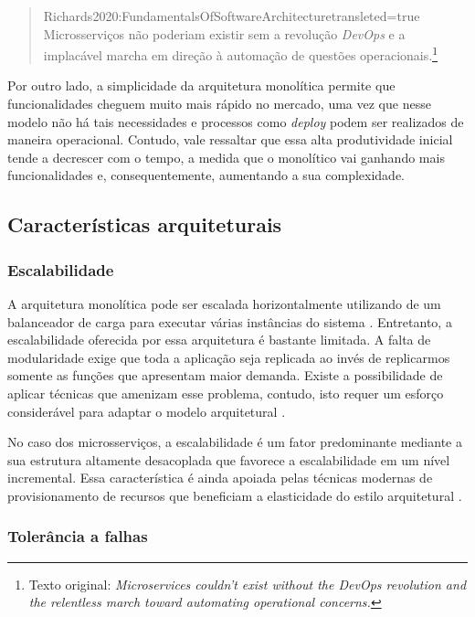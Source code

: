 \begin{quotation}{Richards2020:FundamentalsOfSoftwareArchitecture}{transleted=true}
    Microsserviços não poderiam existir sem a revolução \textit{DevOps} e a implacável marcha em direção à
    automação de questões operacionais.\footnote{Texto original: \textit{Microservices couldn't exist
    without the DevOps revolution and the relentless march toward automating operational concerns.}}
\end{quotation}

Por outro lado, a simplicidade da arquitetura monolítica permite que funcionalidades cheguem muito
mais rápido no mercado, uma vez que nesse modelo não há tais necessidades e processos como
\textit{deploy} podem ser realizados de maneira operacional. Contudo, vale ressaltar que essa alta
produtividade inicial tende a decrescer com o tempo, a medida que o monolítico vai ganhando mais
funcionalidades e, consequentemente, aumentando a sua complexidade.

\subsection{Características arquiteturais}

\subsubsection{Escalabilidade}
\label{pers:escalabilidade}

A arquitetura monolítica pode ser escalada horizontalmente utilizando de um balanceador de carga
para executar várias instâncias do sistema \cite{MartinFowler:Microservices}. Entretanto, a
escalabilidade oferecida por essa arquitetura é bastante limitada. A falta de modularidade exige que
toda a aplicação seja replicada ao invés de replicarmos somente as funções que apresentam maior demanda.
Existe a possibilidade de aplicar técnicas que amenizam esse problema, contudo, isto requer um esforço
considerável para adaptar o modelo arquitetural \cite{Richards2020:FundamentalsOfSoftwareArchitecture}.

No caso dos microsserviços, a escalabilidade é um fator predominante mediante a sua estrutura
altamente desacoplada que favorece a escalabilidade em um nível incremental. Essa característica é
ainda apoiada pelas técnicas modernas de provisionamento de recursos que beneficiam a elasticidade
do estilo arquitetural \cite{Richards2020:FundamentalsOfSoftwareArchitecture}.

\subsubsection{Tolerância a falhas}
\label{pers:tolerancia}

